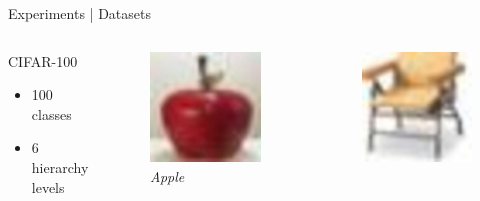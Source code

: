 \begin{frame}{Experiments | Datasets}
  \begin{columns}
    \begin{column}{0.35\textwidth}
      \alert{{\large CIFAR-100}}
      \begin{itemize}
        \item 100 classes
        \item 6 hierarchy levels
      \end{itemize}
    \end{column}
    \begin{column}{0.2\textwidth}
      \begin{figure}
        \centering
        \includegraphics[width=.7\linewidth]{figures/CIFAR100/example_1.jpg}
        \captionsetup{labelformat=empty, justification=centering, font=scriptsize}
        \caption{\emph{Apple}}
      \end{figure}
    \end{column}
    \begin{column}{0.2\textwidth}
      \begin{figure}
        \centering
        \includegraphics[width=.7\linewidth]{figures/CIFAR100/example_2.jpg}

\end{figure}
\end{column}
\end{columns}
\end{frame}
